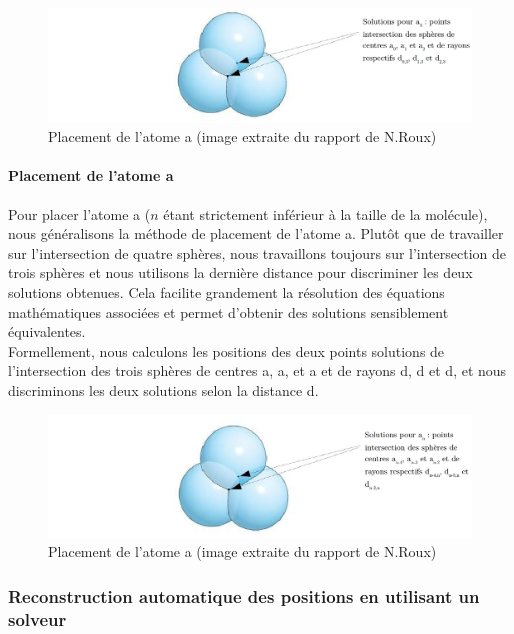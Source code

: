 \begin{figure}[!h]
	\centering
	\includegraphics[scale=0.3]{images/3_spheres.png}
	\caption{Placement de l'atome a (image extraite du rapport de N.Roux)}
\end{figure}



\paragraph{Placement de l'atome a} Pour placer l'atome a ($n$ étant strictement inférieur à la taille de la molécule), nous généralisons la méthode de placement de l'atome a. Plutôt que de travailler sur l'intersection de quatre sphères, nous travaillons toujours sur l'intersection de trois sphères et nous utilisons la dernière distance pour discriminer les deux solutions obtenues. Cela facilite grandement la résolution des équations mathématiques associées et permet d'obtenir des solutions sensiblement équivalentes. \\
Formellement, nous calculons les positions des deux points solutions de l'intersection des trois sphères de centres a, a, et a et de rayons d, d et d, et nous discriminons les deux solutions selon la distance d. 

\begin{figure}[!h]
	\centering
	\includegraphics[scale=0.3]{images/3_spheres_gen.png}
	\caption{Placement de l'atome a (image extraite du rapport de N.Roux)}
\end{figure}

\subsubsection{Reconstruction automatique des positions en utilisant un solveur}

